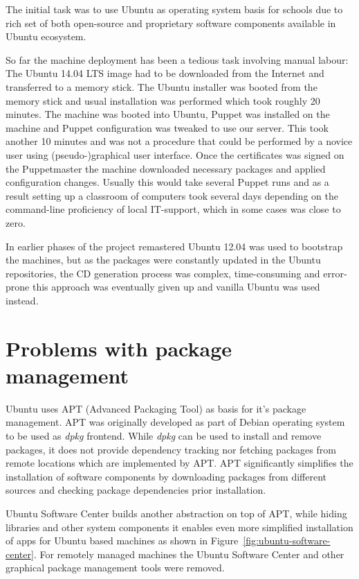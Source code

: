 \documentclass[a4paper,11pt]{kth-mag}
\begin{document}
The initial task was to use Ubuntu as operating system basis
for schools due to rich set of both open-source and
proprietary software components available in Ubuntu ecosystem.

So far the machine deployment has been a tedious task involving
manual labour:
The Ubuntu 14.04 LTS image had to be downloaded from the Internet
and transferred to a memory stick.
The Ubuntu installer was booted from the memory stick
and usual installation was performed which took roughly 20 minutes.
The machine was booted into Ubuntu,
Puppet was installed on the machine and Puppet configuration
was tweaked to use our server.
This took another 10 minutes and was not a procedure that could
be performed by a novice user using (pseudo-)graphical user interface.
Once the certificates was signed on the Puppetmaster the
machine downloaded necessary packages and applied configuration
changes.
Usually this would take several Puppet runs and as a result
setting up a classroom of computers took several days
depending on the command-line proficiency of local
IT-support, which in some cases was close to zero.

In earlier phases of the project remastered Ubuntu 12.04
was used to bootstrap the machines, but as the
packages were constantly updated in the Ubuntu repositories,
the CD generation process was complex, time-consuming and
error-prone this approach was eventually given up
and vanilla Ubuntu was used instead.


\section{Problems with package management}

Ubuntu uses APT (Advanced Packaging Tool) as basis for
it's package management.
APT was originally developed as part of Debian operating system
to be used as \emph{dpkg} frontend.
While \emph{dpkg} can be used to install and remove packages,
it does not provide dependency tracking nor fetching
packages from remote locations which are implemented by APT.
APT significantly simplifies the installation of software
components by downloading packages from different sources
and checking package dependencies prior installation.

Ubuntu Software Center builds another abstraction on top of APT,
while hiding libraries and other system components it enables
even more simplified installation of apps for Ubuntu based
machines as shown in Figure~\ref{fig:ubuntu-software-center}.
For remotely managed machines the Ubuntu Software Center
and other graphical package management tools were removed.
\end{document}
